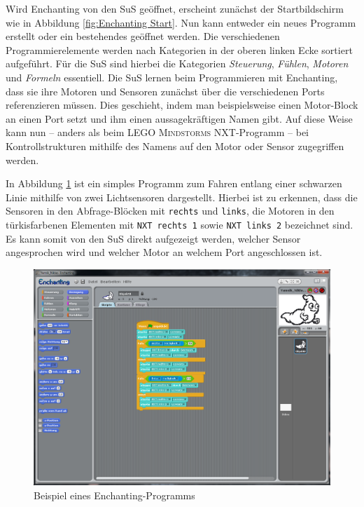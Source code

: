 \documentclass[paper=a4, DIV=calc, BCOR=12mm, twoside=on, onecolumn=on, open = right, titlepage =on, parskip =half-, headsepline = on, footsepline = off, chapterprefix = off, appendixprefix = on, fontsize = 12pt, numbers = noenddot, abstract = on]{scrbook}
\begin{document}
Wird Enchanting von den SuS geöffnet, erscheint zunächst der Startbildschirm wie in Abbildung \ref{fig:Enchanting Start}. Nun kann entweder ein neues Programm erstellt oder ein bestehendes geöffnet werden. Die verschiedenen Programmierelemente werden nach Kategorien in der oberen linken Ecke sortiert aufgeführt. Für die SuS sind hierbei die Kategorien \emph{Steuerung}, \emph{Fühlen}, \emph{Motoren} und \emph{Formeln} essentiell. Die SuS lernen beim Programmieren mit Enchanting, dass sie ihre Motoren und Sensoren zunächst über die verschiedenen Ports referenzieren müssen. Dies geschieht, indem man beispielsweise einen Motor-Block an einen Port setzt und ihm einen aussagekräftigen Namen gibt. Auf diese Weise kann nun -- anders als beim \textsc{LEGO Mindstorms} NXT-Programm -- bei Kontrollstrukturen mithilfe des Namens auf den Motor oder Sensor zugegriffen werden.

In Abbildung \ref{fig:Bsp Enchanting} ist ein simples Programm zum Fahren entlang einer schwarzen Linie mithilfe von zwei Lichtsensoren dargestellt. Hierbei ist zu erkennen, dass die Sensoren in den Abfrage-Blöcken mit \texttt{rechts} und \texttt{links}, die Motoren in den türkisfarbenen Elementen mit \texttt{NXT rechts 1} sowie \texttt{NXT links 2} bezeichnet sind. Es kann somit von den SuS direkt aufgezeigt werden, welcher Sensor angesprochen wird und welcher Motor an welchem Port angeschlossen ist.


\begin{figure}[htb]
\centering
\includegraphics[width=\textwidth]{images/Beispielprogramm_Enchanting.png} 
\caption{Beispiel eines Enchanting-Programms}
\label{fig:Bsp Enchanting}
\end{figure}
\end{document}
